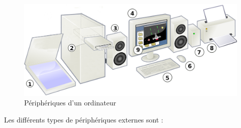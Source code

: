 \begin{figure}[h]
	\centering
	\includegraphics[scale=.3]{Images/ordinateur/peripherique}
	\caption{Périphériques d'un ordinateur}
\end{figure}


Les différents types de périphériques externes sont :
